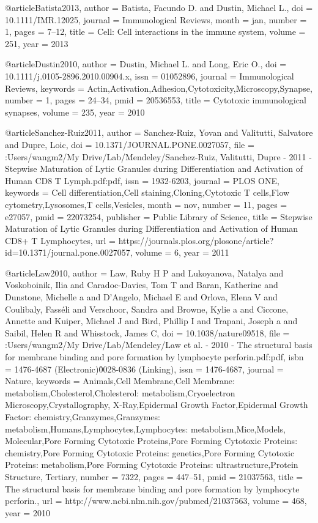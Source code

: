 @article{Batista2013,
author = {Batista, Facundo D. and Dustin, Michael L.},
doi = {10.1111/IMR.12025},
journal = {Immunological Reviews},
month = {jan},
number = {1},
pages = {7--12},
title = {{Cell: Cell interactions in the immune system}},
volume = {251},
year = {2013}
}

@article{Dustin2010,
author = {Dustin, Michael L. and Long, Eric O.},
doi = {10.1111/j.0105-2896.2010.00904.x},
issn = {01052896},
journal = {Immunological Reviews},
keywords = {Actin,Activation,Adhesion,Cytotoxicity,Microscopy,Synapse},
number = {1},
pages = {24--34},
pmid = {20536553},
title = {{Cytotoxic immunological synapses}},
volume = {235},
year = {2010}
}

@article{Sanchez-Ruiz2011,
author = {Sanchez-Ruiz, Yovan and Valitutti, Salvatore and Dupre, Loic},
doi = {10.1371/JOURNAL.PONE.0027057},
file = {:Users/wangm2/My Drive/Lab/Mendeley/Sanchez-Ruiz, Valitutti, Dupre - 2011 - Stepwise Maturation of Lytic Granules during Differentiation and Activation of Human CD8 T Lymph.pdf:pdf},
issn = {1932-6203},
journal = {PLOS ONE},
keywords = {Cell differentiation,Cell staining,Cloning,Cytotoxic T cells,Flow cytometry,Lysosomes,T cells,Vesicles},
month = {nov},
number = {11},
pages = {e27057},
pmid = {22073254},
publisher = {Public Library of Science},
title = {{Stepwise Maturation of Lytic Granules during Differentiation and Activation of Human CD8+ T Lymphocytes}},
url = {https://journals.plos.org/plosone/article?id=10.1371/journal.pone.0027057},
volume = {6},
year = {2011}
}

@article{Law2010,
author = {Law, Ruby H P and Lukoyanova, Natalya and Voskoboinik, Ilia and Caradoc-Davies, Tom T and Baran, Katherine and Dunstone, Michelle a and D'Angelo, Michael E and Orlova, Elena V and Coulibaly, Fass{\'{e}}li and Verschoor, Sandra and Browne, Kylie a and Ciccone, Annette and Kuiper, Michael J and Bird, Phillip I and Trapani, Joseph a and Saibil, Helen R and Whisstock, James C},
doi = {10.1038/nature09518},
file = {:Users/wangm2/My Drive/Lab/Mendeley/Law et al. - 2010 - The structural basis for membrane binding and pore formation by lymphocyte perforin.pdf:pdf},
isbn = {1476-4687 (Electronic)\r0028-0836 (Linking)},
issn = {1476-4687},
journal = {Nature},
keywords = {Animals,Cell Membrane,Cell Membrane: metabolism,Cholesterol,Cholesterol: metabolism,Cryoelectron Microscopy,Crystallography, X-Ray,Epidermal Growth Factor,Epidermal Growth Factor: chemistry,Granzymes,Granzymes: metabolism,Humans,Lymphocytes,Lymphocytes: metabolism,Mice,Models, Molecular,Pore Forming Cytotoxic Proteins,Pore Forming Cytotoxic Proteins: chemistry,Pore Forming Cytotoxic Proteins: genetics,Pore Forming Cytotoxic Proteins: metabolism,Pore Forming Cytotoxic Proteins: ultrastructure,Protein Structure, Tertiary},
number = {7322},
pages = {447--51},
pmid = {21037563},
title = {{The structural basis for membrane binding and pore formation by lymphocyte perforin.}},
url = {http://www.ncbi.nlm.nih.gov/pubmed/21037563},
volume = {468},
year = {2010}
}

